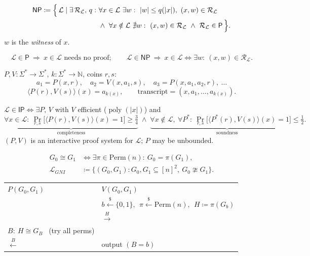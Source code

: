 \documentclass[11pt,a4paper]{article}
\newcommand{\N}{\mathbb{N}}
\newcommand{\bits}{\{0,1\}}
\newcommand{\lang}{\mathcal{L}}
\newcommand{\rel}{\mathcal{R}}
\newcommand{\Perm}{\mathrm{Perm}}
\newcommand{\samp}{\overset{\$}{\leftarrow}}
\newcommand{\iso}{\cong}
\newcommand{\niso}{\ncong}
\DeclareMathOperator{\poly}{poly}
\begin{document}
\begin{definition}[$\mathsf{NP}$]
\begin{align*}
  \mathsf{NP} \coloneqq \Bigl\{\, \lang \mid \exists\, \rel_\lang,\, q:\ 
  &\forall x\in\lang\ \exists w:\ |w|\le q(|x|),\ (x,w)\in\rel_\lang\\
  &\wedge\ \forall x\notin\lang\ \nexists w:\ (x,w)\in\rel_\lang
  \ \wedge\ \rel_\lang \in \mathsf{P} \,\Bigr\}.
\end{align*}
$w$ is the \emph{witness} of $x$.
\end{definition}

\begin{remark}
\[
  \lang\in\mathsf{P}\ \Rightarrow\ x\in\lang \text{ needs no proof};
  \qquad
  \lang\in\mathsf{NP}\ \Rightarrow\ x\in\lang \iff \exists w:\ (x,w)\in\rel_\lang .
\]
\end{remark}

\begin{definition}
$P,V:\Sigma^{*}\to\Sigma^{*}$, $k:\Sigma^{*}\to\N$, coins $r,s$:
\[
  a_1 = P(x,r),\quad a_2 = V(x,a_1,s),\quad a_3 = P(x,a_1,a_2,r),\ \dots
\]
\[
  \langle P(r),V(s)\rangle(x) = a_{k(x)},
  \qquad
  \text{transcript} = (x,a_1,\dots,a_{k(x)}).
\]
\end{definition}

\begin{definition}[$\mathsf{IP}$]
$\lang\in\mathsf{IP} \iff \exists P,\, V$ with $V$ efficient ($\poly(|x|)$) and
\[
  \underbrace{\forall x\in\lang:\ \Pr_{r,s}\!\bigl[\langle P(r),V(s)\rangle(x)=1\bigr]\ge \tfrac34}_{\text{completeness}}
  \;\wedge\;
  \underbrace{\forall x\notin\lang,\ \forall P^*:\ \Pr_{r,s}\!\bigl[\langle P^*(r),V(s)\rangle(x)=1\bigr]\le \tfrac12}_{\text{soundness}} .
\]
$(P,V)$ is an interactive proof system for $\lang$; $P$ may be unbounded.
\end{definition}

\begin{definition}
\begin{align*}
  G_0 \iso G_1 &\iff \exists \pi\in\Perm(n):\ G_0=\pi(G_1),\\
  \lang_{GNI} &\coloneqq \bigl\{(G_0,G_1): G_0,G_1\subseteq[n]^2,\ G_0\niso G_1\bigr\}.
\end{align*}
\end{definition}

\begin{protocol}[$\lang_{GNI}$]
\begin{tabular}{@{}p{}p{}@{}}
$P(G_0,G_1)$ & $V(G_0,G_1)$\\[2pt]
 & $b\samp\bits,\ \ \pi\samp\Perm(n),\ \ H\coloneqq\pi(G_b)$\\
 & \hfill$\xrightarrow{\;H\;}$\\[2pt]
$B:\ H\iso G_B$ \ (try all perms) & \\
\hfill$\xleftarrow{\;B\;}$ & output $(B=b)$\\
\end{tabular}
\end{protocol}
\end{document}
